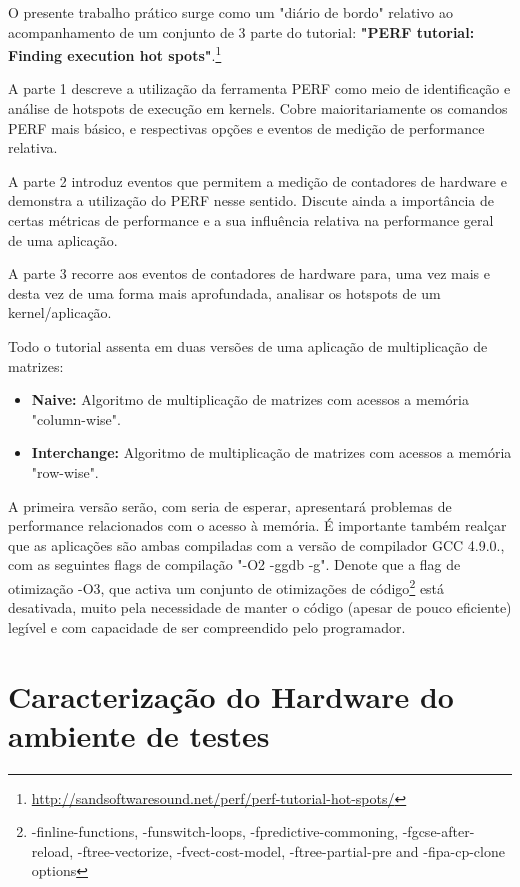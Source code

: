 \documentclass[conference,compsoc]{IEEEtran}
\begin{document}
  O presente trabalho prático surge como um "diário de bordo" relativo ao acompanhamento de um conjunto de 3 parte do tutorial: \textbf{"PERF tutorial: Finding execution hot spots"}.\footnote{\url{http://sandsoftwaresound.net/perf/perf-tutorial-hot-spots/}}
  \par 
  A parte 1 descreve a utilização da ferramenta PERF como meio de identificação e análise de hotspots de execução em kernels. Cobre maioritariamente os comandos PERF mais básico, e respectivas opções e eventos de medição de performance relativa.\par 
  A parte 2 introduz eventos que permitem a medição de contadores de hardware e demonstra a utilização do PERF nesse sentido. Discute ainda a importância de certas métricas de performance e a sua influência relativa na performance geral de uma aplicação.\par 
  A parte 3 recorre aos eventos de contadores de hardware para, uma vez mais e desta vez de uma forma mais aprofundada, analisar os hotspots de um kernel/aplicação.\par 
  Todo o tutorial assenta em duas versões de uma aplicação de multiplicação de matrizes:
  \begin{itemize}
  \item{ \textbf{Naive:} Algoritmo de multiplicação de matrizes com acessos a memória "column-wise". }
  \item{ \textbf{Interchange:}  Algoritmo de multiplicação de matrizes com acessos a memória "row-wise". }
  \end{itemize}
  A primeira versão serão, com seria de esperar, apresentará problemas de performance relacionados com o acesso à memória. É importante também realçar que as aplicações são ambas compiladas com a versão de compilador GCC 4.9.0., com as seguintes flags de compilação "-O2 -ggdb -g". Denote que a flag de otimização -O3, que activa um conjunto de otimizações de código\footnote{-finline-functions, -funswitch-loops, -fpredictive-commoning, -fgcse-after-reload, -ftree-vectorize, -fvect-cost-model, -ftree-partial-pre and -fipa-cp-clone options} está desativada, muito pela necessidade de manter o código (apesar de pouco eficiente) legível e com capacidade de ser compreendido pelo programador.\par 


  \section{Caracterização do Hardware do ambiente de testes}
\end{document}
